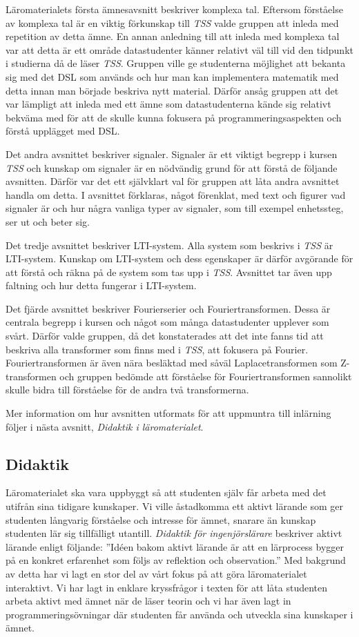 \documentclass[]{article}
\begin{document}
Läromaterialets första ämnesavsnitt beskriver komplexa tal. Eftersom förståelse av komplexa tal är en viktig förkunskap 
till \textit{TSS} valde gruppen att inleda med repetition av detta ämne. En annan anledning till att inleda med komplexa 
tal var att detta är ett område datastudenter känner relativt väl till vid den tidpunkt i studierna då de läser 
\textit{TSS}. Gruppen ville ge studenterna möjlighet att bekanta sig med det DSL som används och hur man kan 
implementera matematik med detta innan man började beskriva nytt material. Därför ansåg gruppen att det var lämpligt att 
inleda med ett ämne som datastudenterna kände sig relativt bekväma med för att de skulle kunna fokusera på 
programmeringsaspekten och förstå upplägget med DSL.

Det andra avsnittet beskriver signaler. Signaler är ett viktigt begrepp i kursen \textit{TSS} och kunskap om signaler är 
en nödvändig grund för att förstå de följande avsnitten. Därför var det ett självklart val för gruppen att låta andra 
avsnittet handla om detta. I avsnittet förklaras, något förenklat, med text och figurer vad signaler är och hur några 
vanliga typer av signaler, som till exempel enhetssteg, ser ut och beter sig.

Det tredje avsnittet beskriver LTI-system. Alla system som beskrivs i \textit{TSS} är LTI-system. Kunskap om LTI-system 
och dess egenskaper är därför avgörande för att förstå och räkna på de system som tas upp i \textit{TSS}. Avsnittet tar 
även upp faltning och hur detta fungerar i LTI-system.

Det fjärde avsnittet beskriver Fourierserier och Fouriertransformen. Dessa är centrala begrepp i kursen och något som 
många datastudenter upplever som svårt. Därför valde gruppen, då det konstaterades att det inte fanns tid att beskriva 
alla transformer som finns med i \textit{TSS}, att fokusera på Fourier. Fouriertransformen är även nära besläktad med 
såväl Laplacetransformen som Z-transformen och gruppen bedömde att förståelse för Fouriertransformen sannolikt skulle 
bidra till förståelse för de andra två transformerna.

Mer information om hur avsnitten utformats för att uppmuntra till inlärning följer i nästa avsnitt, 
\textit{Didaktik i läromaterialet}.

\subsection{Didaktik}
Läromaterialet ska vara uppbyggt så att studenten själv får arbeta med det utifrån sina tidigare 
kunskaper. Vi ville åstadkomma ett aktivt lärande som ger studenten långvarig förståelse och 
intresse för ämnet, snarare än kunskap studenten lär sig tillfälligt utantill. \textit{Didaktik för 
ingenjörslärare} beskriver aktivt lärande enligt följande: ”Idéen bakom aktivt lärande är att en 
lärprocess bygger på en konkret erfarenhet som följs av reflektion och observation.” Med bakgrund av 
detta har vi lagt en stor del av vårt fokus på att göra läromaterialet interaktivt. Vi har lagt in 
enklare kryssfrågor i texten för att låta studenten arbeta aktivt med ämnet när de läser teorin och 
vi har även lagt in programmeringsövningar där studenten får använda och utveckla sina kunskaper i 
ämnet.
\end{document}
